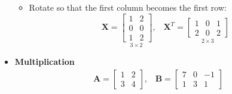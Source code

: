 \begin{itemize}
    \begin{itemize}
        \item Rotate so that the first column becomes the first row:
        \begin{equation*}
            \bm{X} = 
            \underset{3 \times 2}{
            \begin{bmatrix}
                1 & 2 \\
                0 & 0 \\
                1 & 2    
            \end{bmatrix}
            }, 
            \; \; \; 
            \bm{X}^T = 
            \underset{2 \times 3}{
            \begin{bmatrix}
                1 & 0 & 1 \\
                2 & 0 & 2   
            \end{bmatrix}
            }
        \end{equation*}
    \end{itemize} 

    \item \textbf{Multiplication}
        \begin{align*}
            \bm{A} = 
            \begin{bmatrix}
                1 & 2 \\
                3 & 4    
            \end{bmatrix},
            \; \; \; 
            \bm{B} =
            \begin{bmatrix}
                7 & 0 & -1 \\
                1 & 3 & 1
            \end{bmatrix}
        \end{align*}
        

\end{itemize}
